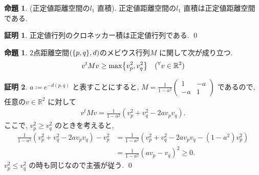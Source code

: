 \documentclass[10pt, fleqn, label-section=none]{bxjsarticle}
\theoremstyle{definition}
\newtheorem{prop}[dfn]{命題}
\newtheorem*{pf*}{証明}
\newcommand{\any}{{}^{\forall}}
\newcommand{\cbra}[1]{\mleft\{#1\mright\}}
\renewcommand{\;}{\, ; \,}
\newcommand{\gyouretsu}[1]{\begin{pmatrix} #1 \end{pmatrix} }
\begin{document}
\begin{prop}(正定値距離空間の$l_1$ 直積). 正定値距離空間の$l_1$ 直積は正定値距離空間である. 

\end{prop}
\begin{pf*}
正定値行列のクロネッカー積は正定値行列である. 
\qed
\end{pf*}

\begin{prop}$2$点距離空間$(\cbra{p, q}, d)$のメビウス行列$M$ に関して次が成り立つ. 
\begin{align*} v^t M v \geq \max \cbra{v_p ^2 , v_q^2 } \quad (\any v \in \mathbb R^2) \end{align*}
\end{prop}
\begin{pf*}
$a \coloneqq e^{-d(p, q)}$ と表すことにすると, $M = \frac{1}{1 - a^2} \gyouretsu{1 & - a \\ - a & 1}$ であるので, 
任意の$v \in \mathbb R^2$ に対して
\begin{align*} v^t M v = \frac{1}{1 - a^2} (v_p^2 + v_q^2 - 2a v_p v_q) . \end{align*}
ここで, $v_p^2 \geq v_q^2$ のときを考えると, 
\begin{align*} \frac{1}{1 - a^2} (v_p^2 + v_q^2 - 2a v_p v_q) - v_p^2 &= \frac{1}{1 - a^2}  (v_p^2 + v_q^2 - 2a v_p v_q - (1-a^2) v_p^2) \\&=  \frac{1}{1 - a^2}  (av_p - v_q) ^2 \geq 0. \end{align*}
$v_p^2 \leq v_q^2$ の時も同じなので主張が従う. 
\qed
\end{pf*}
\end{document}
